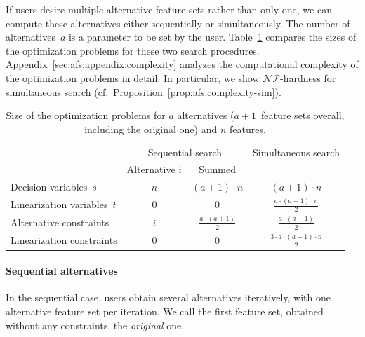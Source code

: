 \documentclass{article}
\theoremstyle{definition}
\begin{document}
If users desire multiple alternative feature sets rather than only one, we can compute these alternatives either sequentially or simultaneously.
The number of alternatives~$a$ is a parameter to be set by the user.
Table~\ref{tab:afs:seq-sim-comparison} compares the sizes of the optimization problems for these two search procedures.
Appendix~\ref{sec:afs:appendix:complexity} analyzes the computational complexity of the optimization problems in detail.
In particular, we show $\mathcal{NP}$-hardness for simultaneous search (cf.~Proposition~\ref{prop:afs:complexity-sim}).
%
\begin{table}[htb]
	\centering
	\renewcommand*{\arraystretch}{1.3}
	\begin{tabular}{lccc}
		\toprule
		& \multicolumn{2}{c}{Sequential search} & Simultaneous search \\
		\cmidrule(r){2-3}
		& Alternative $i$ & Summed & \\
		\midrule
		Decision variables~$s$ & $n$ & $ (a+1) \cdot n$ & $(a+1) \cdot n$ \\
		Linearization variables~$t$ & $0$ & $0$ & $\frac{a \cdot (a+1) \cdot n}{2}$ \\
		Alternative constraints & $i$ & $\frac{a \cdot (a+1)}{2}$ & $\frac{a \cdot (a+1)}{2}$ \\
		Linearization constraints & $0$ & $0$ & $\frac{3 \cdot a \cdot (a+1) \cdot n}{2}$ \\
		\bottomrule
	\end{tabular}
	\caption{Size of the optimization problems for $a$ alternatives ($a + 1$~feature sets overall, including the original one) and $n$ features.}
	\label{tab:afs:seq-sim-comparison}
\end{table}
%
\paragraph{Sequential alternatives}

In the sequential case, users obtain several alternatives iteratively, with one alternative feature set per iteration.
We call the first feature set, obtained without any constraints, the \emph{original} one.
\end{document}
